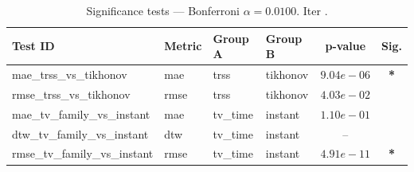 ﻿%
\begin{table}[ht]
\centering
\caption[EEG reconstruction - Iteration it21]{Significance tests — Bonferroni $\alpha=0.0100$. Iter .}
\label{tab:sig_it21_all_datasets_family}
\small
\begin{tabular}{llllcc}
\toprule
Test ID & Metric & Group A & Group B & p-value & Sig. \\
\midrule
mae\_trss\_vs\_tikhonov & mae & trss & tikhonov & $9.04e-06$ & \textbf{*} \\
rmse\_trss\_vs\_tikhonov & rmse & trss & tikhonov & $4.03e-02$ &  \\
mae\_tv\_family\_vs\_instant & mae & tv\_time & instant & $1.10e-01$ &  \\
dtw\_tv\_family\_vs\_instant & dtw & tv\_time & instant & -- &  \\
rmse\_tv\_family\_vs\_instant & rmse & tv\_time & instant & $4.91e-11$ & \textbf{*} \\
\bottomrule
\end{tabular}
\end{table}







